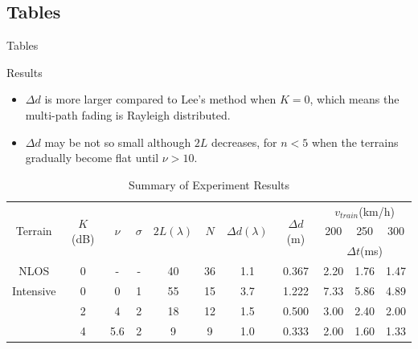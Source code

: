 \subsection{Tables}
\begin{frame}{Tables}
\begin{block}{Results}
\begin{itemize}
  \item $\Delta d$ is more larger compared to Lee's method when $K=0$, which means the multi-path fading is Rayleigh distributed.
  \item $\Delta d$ may be not so small although $2L$ decreases, for $n<5$ when the terrains gradually become flat until $\nu>10$.
\end{itemize}
\end{block}
\begin{table}[!t]
\renewcommand{\arraystretch}{1}
\centering
\begin{threeparttable}[b]
\caption{Summary of Experiment Results}
\label{summary}
\setlength{\tabcolsep}{4pt}
\scriptsize
\begin{tabular}{c|c||c|c||c|c||c|c||c|c|c}
\hline
\multicolumn{1}{c|}{\multirow{3}{*}{Terrain}} & \multicolumn{1}{c||}{\multirow{3}{*}{$K$(dB)}} & \multicolumn{1}{c|}{\multirow{3}{*}{$\nu$}} & \multicolumn{1}{c||}{\multirow{3}{*}{$\sigma$}} & \multicolumn{1}{c|}{\multirow{3}{*}{$2L(\lambda)$}} & \multicolumn{1}{c||}{\multirow{3}{*}{$N$}} & \multicolumn{1}{c|}{\multirow{3}{*}{$\Delta d(\lambda)$}} & \multicolumn{1}{c||}{\multirow{3}{*}{$\Delta d$(m)}} & \multicolumn{3}{c}{$v_{train}$(km/h)}\\
\cline{9-11}
\multicolumn{1}{c|}{} & \multicolumn{1}{c||}{} & \multicolumn{1}{c|}{} & \multicolumn{1}{c||}{} & \multicolumn{1}{c|}{} & \multicolumn{1}{c||}{} & \multicolumn{1}{c|}{} & \multicolumn{1}{c||}{} & 200 & 250 & 300\\
\cline{9-11}
\multicolumn{1}{c|}{}& \multicolumn{1}{c||}{} & \multicolumn{1}{c|}{} & \multicolumn{1}{c||}{} & \multicolumn{1}{c|}{} & \multicolumn{1}{c||}{} & \multicolumn{1}{c|}{} & \multicolumn{1}{c||}{} & \multicolumn{3}{c}{$\Delta t$(ms)}\\
\cline{1-11}
NLOS\tnote{*}  &  0 &    - & - & 40 & 36 &  1.1 & 0.367 &  2.20 &  1.76 &  1.47\\
\hline
Intensive  &  0 &    0 & 1 & 55 & 15 &  3.7 & 1.222 &  7.33 &  5.86 &  4.89\\
           &  2 &    4 & 2 & 18 & 12 &  1.5 & 0.500 &  3.00 &  2.40 &  2.00\\
           &  4 &  5.6 & 2 &  9 &  9 &  1.0 & 0.333 &  2.00 &  1.60 &  1.33\\

\end{tabular}
\end{threeparttable}
\end{table}
\end{frame}
